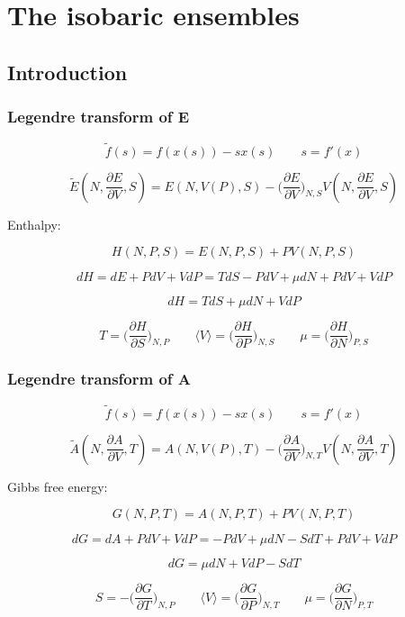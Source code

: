 \graphicspath{{chapters/12/images/}}
\chapter{The isobaric ensembles}

\section{Introduction}

	\subsection{Legendre transform of E}

	$$\tilde{f}(s) = f(x(s))-sx(s)\qquad s = f'(x)$$

	$$\tilde{E}(N, \frac{\partial E}{\partial V}, S) = E(N, V(P), S) - \biggl(\frac{\partial E}{\partial V}\biggr)_{N, S}V(N, \frac{\partial E}{\partial V}, S)$$

	Enthalpy:

	$$H(N, P, S) = E(N, P, S) + PV(N, P, S)$$

	$$dH = dE + PdV + VdP = TdS - PdV + \mu dN + PdV + VdP$$

	$$dH = TdS + \mu dN + VdP$$

	$$T = \biggl(\frac{\partial H}{\partial S}\biggr)_{N, P} \qquad \langle V\rangle = \biggl(\frac{\partial H}{\partial P}\biggr)_{N, S} \qquad \mu = \biggl(\frac{\partial H}{\partial N}\biggr)_{P, S}$$

	\subsection{Legendre transform of A}

	$$\tilde{f}(s) = f(x(s))-sx(s)\qquad s = f'(x)$$

	$$\tilde{A}(N, \frac{\partial A}{\partial V}, T) = A(N, V(P), T)- \biggl(\frac{\partial A}{\partial V}\biggr)_{N, T}V(N, \frac{\partial A}{\partial V}, T)$$

	Gibbs free energy:

	$$G(N, P, T) = A(N, P, T) + PV(N, P, T)$$

	$$dG = dA + PdV + VdP = -PdV + \mu dN - SdT + PdV + VdP$$

	$$dG = \mu dN + VdP - SdT$$

	$$S = -\biggl(\frac{\partial G}{\partial T}\biggr)_{N, P}\qquad\langle V\rangle = \biggl(\frac{\partial G}{\partial P}\biggr)_{N, T}\qquad \mu = \biggl(\frac{\partial G}{\partial N}\biggr)_{P, T}$$

